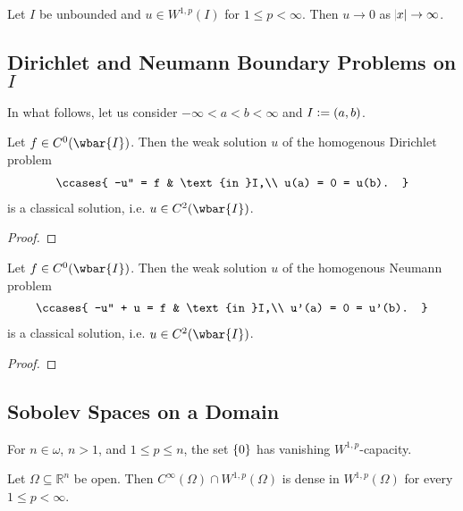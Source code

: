 \begin{corollary}
	Let $I$ be unbounded and $u \in W^{1,p}(I)$ for $1 \leq p < \infty$. Then $u \to 0$ as $\abs{x} \to \infty$.
\end{corollary}

\subsection*{Dirichlet and Neumann Boundary Problems on $I$}
In what follows, let us consider $-\infty < a < b < \infty$ and $I := \intoo{a,b}$.

\begin{proposition}
	Let $f \in C^0(\wbar{I})$. Then the weak solution $u$ of the homogenous Dirichlet problem
	\begin{align*}
		\ccases{
			-u'' = f & \text{in }I,\\
			u(a) = 0 = u(b).
		}
	\end{align*}
	\noindent is a classical solution, i.e. $u \in C^2(\wbar{I})$.
\end{proposition}

\begin{proof}
	
\end{proof}

\begin{proposition}
	Let $f \in C^0(\wbar{I})$. Then the weak solution $u$ of the homogenous Neumann problem
	\begin{align*}
		\ccases{
			-u'' + u = f & \text{in }I,\\
			u'(a) = 0 = u'(b).
		}
	\end{align*}
	\noindent is a classical solution, i.e. $u \in C^2(\wbar{I})$.
\end{proposition}

\begin{proof}
	
\end{proof}

\subsection*{Sobolev Spaces on a Domain}

\begin{example}
	For $n \in \omega$, $n > 1$, and $1 \leq p \leq n$, the set $\cbr{0}$ has vanishing $W^{1,p}$-capacity.
\end{example}

\begin{theorem}
	Let $\Omega \subseteq \mathbb{R}^n$ be open. Then $C^\infty(\Omega) \cap W^{1,p}(\Omega)$ is dense in $W^{1,p}(\Omega)$ for every $1 \leq p < \infty$.
\end{theorem}

